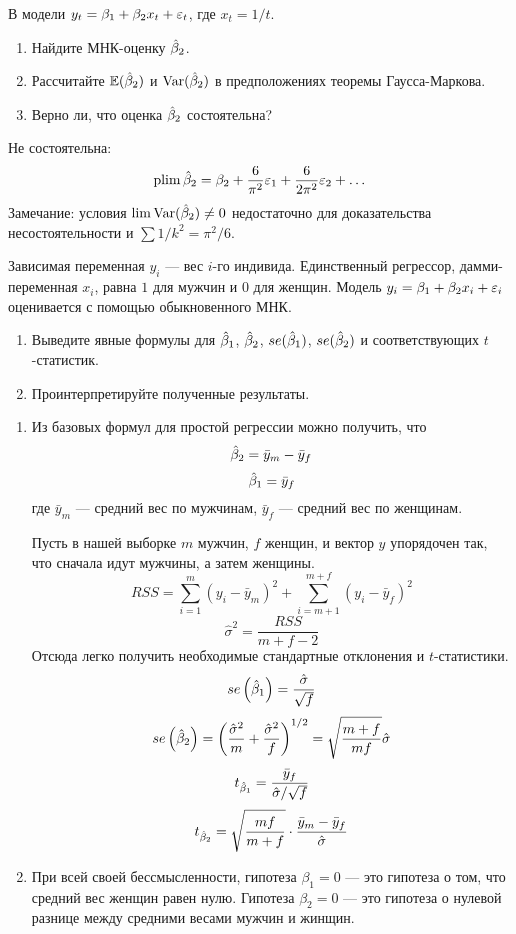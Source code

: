 \begin{problem}
В модели $y_t=\beta_1+\beta_2 x_t + \varepsilon_t$, где $x_t=1/t$.
\begin{enumerate}
\item Найдите МНК-оценку $\hat{\beta}_2$.
\item Рассчитайте $\mathbb{E}(\hat{\beta}_2)$ и $\operatorname{Var}(\hat{\beta}_2)$ в предположениях теоремы Гаусса-Маркова.
\item Верно ли, что оценка $\hat{\beta}_2$ состоятельна?
\end{enumerate}


\begin{sol}
Не состоятельна:
\[
\operatorname*{plim} \hat{\beta}_2 = \beta_2 + \frac{6}{\pi^2}\varepsilon_1 + \frac{6}{2\pi^2}\varepsilon_2 + \ldots
\]
Замечание: условия $\lim \operatorname{Var}(\hat{\beta}_2) \neq 0$ недостаточно для доказательства несостоятельности и $\sum 1/k^2 = \pi^2/6$.


\end{sol}
\end{problem}



\begin{problem}
Зависимая переменная $y_i$ — вес $i$-го индивида. Единственный регрессор, дамми-переменная $x_i$, равна $1$ для мужчин и $0$ для женщин. Модель $y_i=\beta_1 + \beta_2 x_i +\varepsilon_i$ оценивается с помощью обыкновенного МНК.
\begin{enumerate}
\item Выведите явные формулы для $\hat{\beta}_1$, $\hat{\beta}_2$, $se(\hat{\beta}_1)$, $se(\hat{\beta}_2)$ и соответствующих $t$-статистик.
\item Проинтерпретируйте полученные результаты.
\end{enumerate}


\begin{sol}
\begin{enumerate}
\item Из базовых формул для простой регрессии можно получить, что
\[\hat{\beta}_2 = \bar{y}_m - \bar{y}_f \]
\[\hat{\beta}_1 = \bar{y}_f  \]
где \(\bar{y}_m\) — средний вес по мужчинам, \(\bar{y}_f\) — средний вес по женщинам.

Пусть в нашей выборке \(m\) мужчин, \(f\) женщин, и вектор \(y\) упорядочен так, что сначала идут мужчины, а затем женщины.
\[RSS = \sum_{i = 1}^m (y_i - \bar{y}_m)^2 + \sum_{i = m+1}^{m+f} (y_i - \bar{y}_f)^2 \]
\[\hat{\sigma}^2 = \frac{RSS}{m + f - 2}  \]
Отсюда легко получить необходимые стандартные отклонения и \(t\)-статистики.
\[se\left(\hat{\beta}_1 \right) = \frac{\hat{\sigma}}{\sqrt{f}} \]
\[se\left(\hat{\beta}_2 \right) = \left(\frac{\hat{\sigma}^2}{m} + \frac{\hat{\sigma}^2}{f} \right)^{1/2}= \sqrt{\frac{m+f}{mf}} \hat{\sigma} \]
\[t_{\hat{\beta}_1} = \frac{\bar{y}_f}{\hat{\sigma}/\sqrt{f}}\]
\[t_{\hat{\beta}_2} = \sqrt{\frac{mf}{m+f}} \cdot\frac{\bar{y}_m - \bar{y}_f}{\hat{\sigma}}\]
\item При всей своей бессмысленности, гипотеза \(\beta_1 = 0\) — это гипотеза о том, что средний вес женщин равен нулю. Гипотеза \(\beta_2 = 0\) — это гипотеза о нулевой разнице между средними весами мужчин и жинщин.
\end{enumerate}

\end{sol}
\end{problem}


